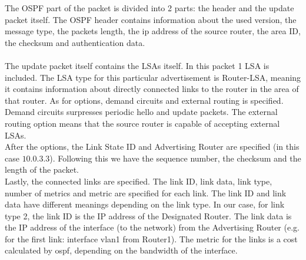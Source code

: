 The OSPF part of the packet is divided into 2 parts: the header and the update packet itself. The OSPF header contains information about the used version, the message type, the packets length, the ip address of the source router, the area ID, the checksum and authentication data. \\ \\
The update packet itself contains the LSAs itself. In this packet 1 LSA is included.  The LSA type for this particular advertisement is Router-LSA, meaning it contains information about directly connected links to the router in the area of that router. As for options, demand circuits and external routing is specified. Demand circuits surpresses periodic hello and update packets. The external routing option means that the source router is capable of accepting external LSAs. \\
After the options, the Link State ID and Advertising Router are specified (in this case $10.0.3.3$). Following this we have the sequence number, the checksum and the length of the packet. \\
Lastly, the connected links are specified. The link ID, link data, link type, number of metrics and metric are specified for each link. The link ID and link data have different meanings depending on the link type. In our case, for link type 2, the link ID is the IP address of the Designated Router. The link data is the IP address of the interface (to the network) from the Advertising Router (e.g. for the first link: interface vlan1 from Router1). The metric for the links is a cost calculated by ospf, depending on the bandwidth of the interface.